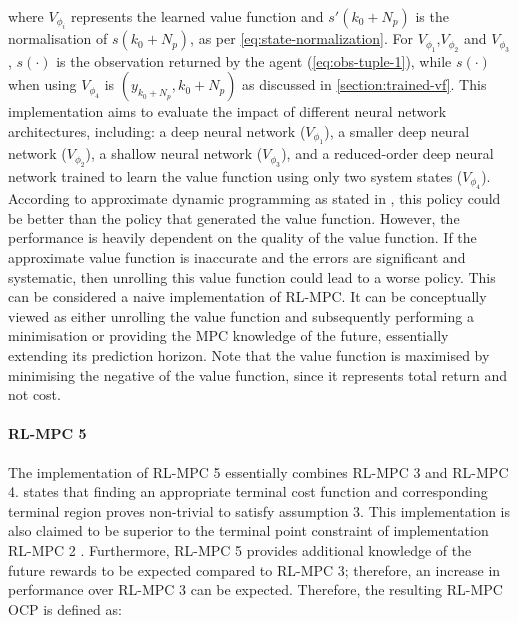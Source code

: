 where $V_{\phi_i}$ represents the learned value function and $s'(k_0+N_p)$ is the normalisation of $s(k_0+N_p)$, as per \autoref{eq:state-normalization}. For $V_{\phi_1}$,$V_{\phi_2}$ and $V_{\phi_3}$, $s(\cdot)$ is the observation returned by the agent (\autoref{eq:obs-tuple-1}), while $s(\cdot)$ when using $V_{\phi_4}$ is $(y_{k_0+N_p},k_0+N_p)$ as discussed in \autoref{section:trained-vf}. This implementation aims to evaluate the impact of different neural network architectures, including: a deep neural network ($V_{\phi_1}$), a smaller deep neural network ($V_{\phi_2}$), a shallow neural network ($V_{\phi_3}$), and a reduced-order deep neural network trained to learn the value function using only two system states ($V_{\phi_4}$). According to approximate dynamic programming as stated in \cite{bertsekasLessonsAlphaZeroOptimal}, this policy could be better than the policy that generated the value function. However, the performance is heavily dependent on the quality of the value function. If the approximate value function is inaccurate and the errors are significant and systematic, then unrolling this value function could lead to a worse policy. This can be considered a naive implementation of RL-MPC. It can be conceptually viewed as either unrolling the value function and subsequently performing a minimisation or providing the MPC knowledge of the future, essentially extending its prediction horizon. Note that the value function is maximised by minimising the negative of the value function, since it represents total return and not cost.

\paragraph{RL-MPC 5}
The implementation of RL-MPC 5 essentially combines RL-MPC 3 and RL-MPC 4. \citet{amritEconomicOptimizationUsing2011} states that finding an appropriate terminal cost function and corresponding terminal region proves non-trivial  to satisfy assumption 3. This implementation is also claimed to be superior to the terminal point constraint of implementation RL-MPC 2 \cite{amritEconomicOptimizationUsing2011}. Furthermore, RL-MPC 5 provides additional knowledge of the future rewards to be expected compared to RL-MPC 3; therefore, an increase in performance over RL-MPC 3 can be expected. Therefore, the resulting RL-MPC OCP is defined as:

